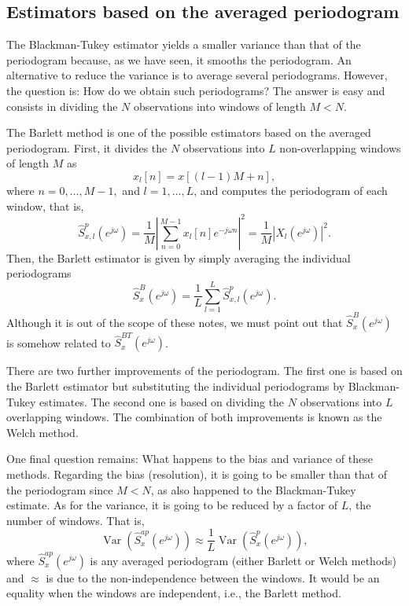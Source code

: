 \subsection{Estimators based on the averaged periodogram}

The Blackman-Tukey estimator yields a smaller variance than that of the periodogram because, as we have seen, it smooths the periodogram. An alternative to reduce the variance is to average several periodograms. However, the question is: How do we obtain such periodograms? The answer is easy and consists in dividing the $N$ observations into windows of length $M < N$. 

The Barlett method is one of the possible estimators based on the averaged periodogram. First, it divides the $N$ observations into $L$ non-overlapping windows of length $M$ as
\begin{equation*}
	x_l[n] = x[(l-1) M + n],
\end{equation*}
where $n = 0, \ldots, M-1,$ and $l = 1, \ldots, L$, and computes the periodogram of each window, that is,
\begin{equation*}
\hat{S}_{x,l}^{p}(e^{j \omega}) = \frac{1}{M} \left| \sum_{n = 0}^{M-1} x_l[n] e^{-j \omega n} \right|^2 = \frac{1}{M} \left| X_l(e^{j \omega}) \right|^2.
\end{equation*}
Then, the Barlett estimator is given by simply averaging the individual periodograms
\begin{equation*}
\hat{S}_{x}^{B}(e^{j \omega}) = \frac{1}{L} \sum_{l = 1}^{L}\hat{S}_{x,l}^{p}(e^{j \omega}).
\end{equation*}
Although it is out of the scope of these notes, we must point out that $\hat{S}_{x}^{B}(e^{j \omega})$ is somehow related to $\hat{S}_{x}^{BT}(e^{j \omega})$.

There are two further improvements of the periodogram. The first one is based on the Barlett estimator but substituting the individual periodograms by Blackman-Tukey estimates. The second one is based on dividing the $N$ observations into $L$ overlapping windows. The combination of both improvements is known as the Welch method.

One final question remains: What happens to the bias and variance of these methods. Regarding the bias (resolution), it is going to be smaller than that of the periodogram since $M < N$, as also happened to the Blackman-Tukey estimate. As for the variance, it is going to be reduced by a factor of $L$, the number of windows. That is,
\begin{equation*}
\mathop{Var}\left(\hat{S}_x^{ap}(e^{j \omega})\right) \approx \frac{1}{L} \mathop{Var}\left(\hat{S}_x^{p}(e^{j \omega})\right),
\end{equation*}
where $\hat{S}_x^{ap}(e^{j \omega})$ is any averaged periodogram (either Barlett or Welch methods) and $\approx$ is due to the non-independence between the windows. It would be an equality when the windows are independent, i.e., the Barlett method.


